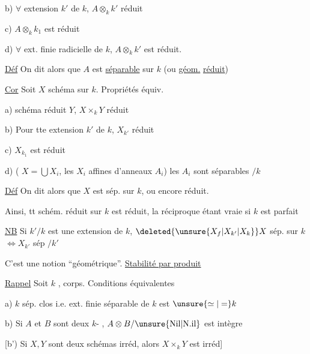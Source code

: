 b) $\forall$ extension $k'$ de $k$, $A\otimes_k k'$ réduit

c) $A\otimes_k k_1$ est réduit

d) $\forall$ ext. finie  radicielle de $k$, $A\otimes_k k'$ est réduit.


\uline{Déf} On dit alors que $A$ est \uline{séparable} sur $k$ (ou \uline{géom.} \uline{réduit})

\uline{Cor} Soit $X$ schéma sur $k$. Propriétés équiv.

a)   schéma réduit $Y$, $X\times_k Y$ réduit

b) Pour tte  extension $k'$ de $k$, $X_{k'}$ réduit

c) $X_{k_1}$ est réduit

 d) ( $X=\bigcup X_i$, les $X_i$ affines  d'anneaux $A_i$) les $A_i$ sont séparables $/k$

\uline{Déf} On dit alors que $X$ est sép. sur $k$, ou encore   réduit.

Ainsi,  tt schém.  réduit sur $k$ est  réduit, la réciproque étant vraie si $k$ est parfait

\uline{NB} Si $k'/k$ est une extension de $k$, $\deleted{\unsure{X_f|X_{k'}|X_k}}X$ sép. sur $k$ $\Longleftrightarrow X_{k'}$ sép $/k'$

C'est une notion ``géométrique''. \hfill\uline{Stabilité par produit}


\uline{Rappel} Soit $k$ , corps. Conditions équivalentes

a) $k$ sép. clos i.e.  ext. finie séparable de $k$ est $\unsure{\simeq|=} k$

b) Si $A$ et $B$ sont deux $k$- , $A\otimes B/\mathrm{\unsure{Nil|N.il}}$ est intègre

[b') Si $X,Y$ sont deux schémas irréd, alors $X\times_k Y$ est irréd]

